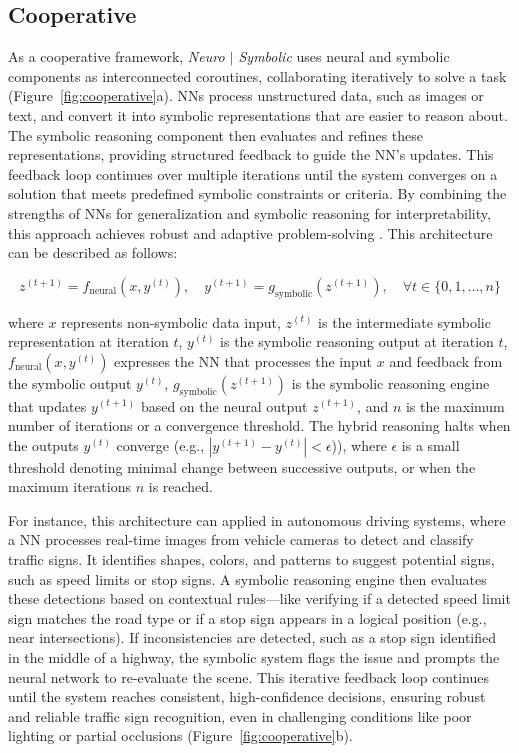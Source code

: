 \documentclass[12pt]{article}
\begin{document}
\subsection{Cooperative}
As a cooperative framework, \textit{Neuro $|$ Symbolic} uses neural and symbolic components as interconnected coroutines, collaborating iteratively to solve a task (Figure~\ref{fig:cooperative}a). NNs process unstructured data, such as images or text, and convert it into symbolic representations that are easier to reason about. The symbolic reasoning component then evaluates and refines these representations, providing structured feedback to guide the NN’s updates. This feedback loop continues over multiple iterations until the system converges on a solution that meets predefined symbolic constraints or criteria. By combining the strengths of NNs for generalization and symbolic reasoning for interpretability, this approach achieves robust and adaptive problem-solving \cite{mao2019neuro}. This architecture can be described as follows:

\begin{equation}
z^{(t+1)} = f_\text{neural}(x, y^{(t)}), \quad y^{(t+1)} = g_\text{symbolic}(z^{(t+1)}), \quad \forall t \in \{0, 1, \dots, n\}    
\end{equation}

\noindent where $x$ represents non-symbolic data input, $z^{(t)}$ is the intermediate symbolic representation at iteration $t$, $y^{(t)}$ is the symbolic reasoning output at iteration $t$, $f_\text{neural}(x, y^{(t)})$ expresses the NN that processes the input $x$ and feedback from the symbolic output $y^{(t)}$, $g_\text{symbolic}(z^{(t+1)})$ is the symbolic reasoning engine that updates $y^{(t+1)}$ based on the neural output $z^{(t+1)}$, and $n$ is the maximum number of iterations or a convergence threshold. The hybrid reasoning halts when the outputs $y^{(t)}$ converge (e.g., $|y^{(t+1)} - y^{(t)}| < \epsilon$)), where $\epsilon$ is a small threshold denoting minimal change between successive outputs, or when the maximum iterations $n$ is reached.

For instance, this architecture can applied in autonomous driving systems, where a NN processes real-time images from vehicle cameras to detect and classify traffic signs. It identifies shapes, colors, and patterns to suggest potential signs, such as speed limits or stop signs. A symbolic reasoning engine then evaluates these detections based on contextual rules—like verifying if a detected speed limit sign matches the road type or if a stop sign appears in a logical position (e.g., near intersections). If inconsistencies are detected, such as a stop sign identified in the middle of a highway, the symbolic system flags the issue and prompts the neural network to re-evaluate the scene. This iterative feedback loop continues until the system reaches consistent, high-confidence decisions, ensuring robust and reliable traffic sign recognition, even in challenging conditions like poor lighting or partial occlusions (Figure~\ref{fig:cooperative}b).
\end{document}
